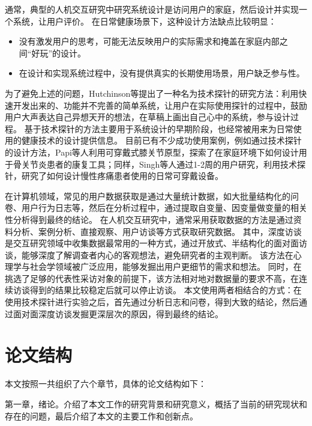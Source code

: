 通常，典型的人机交互研究中研究系统设计是访问用户的家庭，然后设计并实现一个系统，让用户评价。
在日常健康场景下，这种设计方法缺点比较明显\cite{Hutchinson2003Technology}：

\begin{itemize}
    \item 没有激发用户的思考，可能无法反映用户的实际需求和掩盖在家庭内部之间``好玩''的设计。
    \item 在设计和实现系统过程中，没有提供真实的长期使用场景，用户缺乏参与性。
\end{itemize}


为了避免上述的问题，Hutchinson等\cite{Hutchinson2003Technology}提出了一种名为技术探针的研究方法：利用快速开发出来的、功能并不完善的简单系统，让用户在实际使用探针的过程中，鼓励用户大声表达自己异想天开的想法，在草稿上画出自己心中的系统，参与设计过程。
基于技术探针的方法主要用于系统设计的早期阶段\cite{turmo2020training}，也经常被用来为日常使用的健康技术的设计提供信息。
目前已有不少成功使用案例，例如通过技术探针的设计方法，Papi等人\cite{papi2015knee}利用可穿戴式膝关节原型，探索了在家庭环境下如何设计用于骨关节炎患者的康复工具；同样，Singh等人\cite{singh2017supporting}通过1-2周的用户研究，利用技术探针，研究了如何设计慢性疼痛患者使用的日常可穿戴设备。

在计算机领域，常见的用户数据获取是通过大量统计数据，如大批量结构化的问卷、用户行为日志等，然后在分析过程中，通过提取自变量、因变量做变量的相关性分析得到最终的结论。
在人机交互研究中，通常采用获取数据的方法是通过资料分析、案例分析、直接观察、用户访谈等方式获取研究数据。
其中，深度访谈是交互研究领域中收集数据最常用的一种方式，通过开放式、半结构化的面对面访谈，能够深度了解调查者内心的客观想法，避免研究者的主观判断。
该方法在心理学与社会学领域被广泛应用，能够发掘出用户更细节的需求和想法。
同时，在挑选了足够的代表性采访对象的前提下，该方法相对地对数据量的要求不高，在连续访谈得到的结果比较稳定后就可以停止访谈\cite{cleary2014data}。
本文使用两者相结合的方式：在使用技术探针进行实验之后，首先通过分析日志和问卷，得到大致的结论，然后通过面对面深度访谈发掘更深层次的原因，得到最终的结论。



\section{论文结构}
本文按照一共组织了六个章节，具体的论文结构如下：

第一章，绪论。介绍了本文工作的研究背景和研究意义，概括了当前的研究现状和存在的问题，最后介绍了本文的主要工作和创新点。

